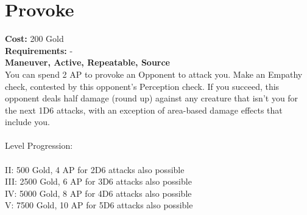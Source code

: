 \section*{Provoke}
\textbf{Cost:} 200 Gold\\
\textbf{Requirements:} -\\
\textbf{Maneuver, Active, Repeatable, Source}\\
You can spend 2 AP to provoke an Opponent to attack you. Make an Empathy check, contested by this opponent’s Perception check. If you succeed, this opponent deals half damage (round up) against any creature that isn’t you for the next 1D6 attacks, with an exception of area-based damage effects that include you.\\
\\
Level Progression:\\
\\
II: 500 Gold, 4 AP for 2D6 attacks also possible\\
III: 2500 Gold, 6 AP for 3D6 attacks also possible\\
IV: 5000 Gold, 8 AP for 4D6 attacks also possible\\
V: 7500 Gold, 10 AP for 5D6 attacks also possible\\